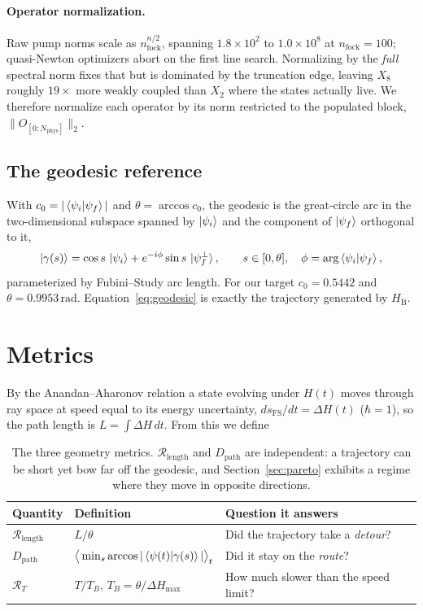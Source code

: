 \documentclass[10pt]{article}
\newcommand{\Dpath}{D_{\mathrm{path}}}
\newcommand{\Rlen}{\mathcal{R}_{\mathrm{length}}}
\newcommand{\HB}{H_{\mathrm{B}}}
\begin{document}
\paragraph{Operator normalization.} Raw pump norms scale as
$n_{\mathrm{fock}}^{n/2}$, spanning $1.8\times10^{2}$ to $1.0\times10^{8}$ at
$n_{\mathrm{fock}}=100$; quasi-Newton optimizers abort on the first line search.
Normalizing by the \emph{full} spectral norm fixes that but is dominated by the
truncation edge, leaving $X_8$ roughly $19\times$ more weakly coupled than $X_2$
where the states actually live. We therefore normalize each operator by its norm
restricted to the populated block, $\|O_{[0:N_{\mathrm{phys}}]}\|_2$.

\subsection{The geodesic reference}

With $c_0=|\braket{\psi_i|\psi_f}|$ and $\theta=\arccos c_0$, the geodesic is the
great-circle arc in the two-dimensional subspace spanned by $\ket{\psi_i}$ and the
component of $\ket{\psi_f}$ orthogonal to it,
\begin{equation}
\ket{\gamma(s)} = \cos s\,\ket{\psi_i} + e^{-i\phi}\sin s\,\ket{\psi_f^{\perp}},
\qquad s\in[0,\theta], \quad \phi=\arg\braket{\psi_i|\psi_f},
\label{eq:geodesic}
\end{equation}
parameterized by Fubini--Study arc length. For our target $c_0=0.5442$ and
$\theta=0.9953\,\mathrm{rad}$. Equation~\eqref{eq:geodesic} is exactly the
trajectory generated by $\HB$.

\section{Metrics}

By the Anandan--Aharonov relation a state evolving under $H(t)$ moves through ray
space at speed equal to its energy uncertainty, $ds_{\mathrm{FS}}/dt=\Delta H(t)$
($\hbar=1$), so the path length is $L=\int \Delta H\,dt$. From this we define

\begin{table}[t]
\centering
\small
\begin{tabular}{@{}lll@{}}
\toprule
Quantity & Definition & Question it answers \\
\midrule
$\Rlen$ & $L/\theta$ & Did the trajectory take a \emph{detour}? \\
$\Dpath$ & $\big\langle \min_s \arccos|\braket{\psi(t)|\gamma(s)}| \big\rangle_t$
 & Did it stay on the \emph{route}? \\
$\mathcal{R}_T$ & $T/T_B$, $T_B=\theta/\Delta H_{\max}$ & How much slower than the speed limit? \\
\bottomrule
\end{tabular}
\caption{The three geometry metrics. $\Rlen$ and $\Dpath$ are independent: a
trajectory can be short yet bow far off the geodesic, and
Section~\ref{sec:pareto} exhibits a regime where they move in opposite
directions.}
\label{tab:metrics}
\end{table}
\end{document}
